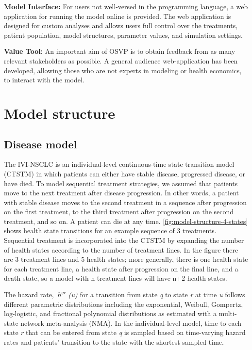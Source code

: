 \documentclass[11pt,final,fleqn]{article}\usepackage[]{graphicx}\usepackage[]{color}
\theoremstyle{plain}
\begin{document}
{\textbf{Model Interface:} For users not well-versed in the programming language, a web application for running the model online is provided. The web application is designed for custom analyses and allows users full control over the treatments, patient population, model structures, parameter values, and simulation settings.

\textbf{Value Tool:} An important aim of OSVP is to obtain feedback from as many relevant stakeholders as possible. A general audience web-application has been developed, allowing those who are not experts in modeling or health economics, to interact with the model.

\section{Model structure}\label{sec:model-structure}

\subsection{Disease model}

The IVI-NSCLC is an individual-level continuous-time state transition model (CTSTM) in which patients can either have stable disease, progressed disease, or have died. To model sequential treatment strategies, we assumed that patients move to the next treatment after disease progression. In other words, a patient with stable disease moves to the second treatment in a sequence after progression on the first treatment, to the third treatment after progression on the second treatment, and so on. A patient can die at any time. \autoref{fig:model-structure-4-states} shows health state transitions for an example sequence of 3 treatments. Sequential treatment is incorporated into the CTSTM by expanding the number of health states according to the number of treatment lines. In the figure there are 3 treatment lines and 5 health states; more generally, there is one health state for each treatment line, a health state after progression on the final line, and a death state, so a model with n treatment lines will have n+2 health states. 

The hazard rate, $\ h^{qr} $ \textit{(u)} for a transition from state \textit{q} to state \textit{r} at time \textit{u} follows different parametric distributions including the exponential, Weibull, Gompertz, log-logistic, and fractional polynomial distributions as estimated with a multi-state network meta-analysis (NMA). In the individual-level model, time to each state \textit{r} that can be entered from state \textit{q} is sampled based on time-varying hazard rates and patients' transition to the state with the shortest sampled time.

}
\end{document}
